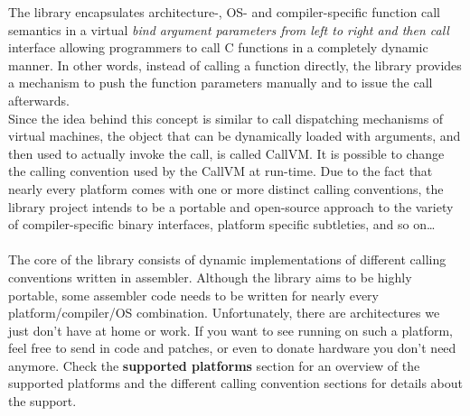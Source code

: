 The  library encapsulates architecture-, OS- and compiler-specific
function call semantics in a virtual %
%
%
\emph{bind argument parameters from left to right and then call}
%
interface allowing programmers to call C functions 
in a completely dynamic manner. In other words, instead of calling a function 
directly, the  library provides a mechanism to push the function parameters 
manually and to issue the call afterwards.\\
Since the idea behind this concept is similar to call dispatching mechanisms
of virtual machines, the object that can be dynamically loaded with arguments,
and then used to actually invoke the call, is called CallVM. It is possible to
change the calling convention used by the CallVM at run-time.
Due to the fact that nearly every platform comes with one or more distinct calling
conventions, the  library project intends to be a portable and open-source
approach to the variety of compiler-specific binary interfaces, platform specific
subtleties, and so on\ldots\\
\\
The core of the library consists of dynamic implementations of different 
calling conventions written in assembler.
Although the library aims to be highly portable, some assembler code needs to 
be written for nearly every platform/compiler/OS combination.
Unfortunately, there are architectures we just don't have at home or work. If 
you want to see  running on such a platform, feel free to send
in code and patches, or even to donate hardware you don't need anymore.
Check the \textbf{supported platforms} section for an overview of the supported 
platforms and the different calling convention sections for details about the 
support.
\\
\begin{comment}
@@@
A typical binary library consists of symbolic names that map to variables and
functions, the latter being pre-compiled for a
specific calling convention and architecture. Given \product{dyncall} has been ported to
that binary platform, it is possible to call such a function dynamically 
without writing glue code or prototypes or even knowing its C declaration - 
all that is needed is a pointer to it.\\
To avoid confusion, note that from the point of view of the library all 
parameters are handled the same way, even though the implementation might use
other ways to pass parameters in order to suit specific calling conventions.\\
\end{comment}


